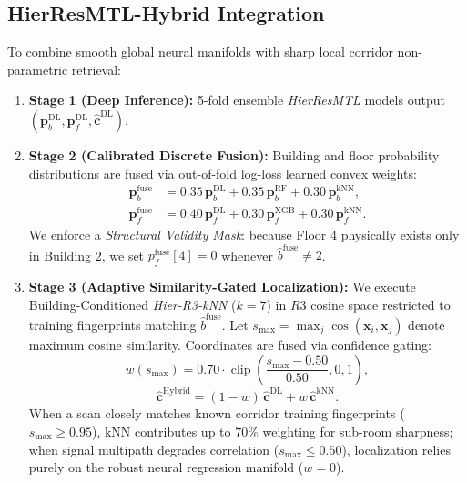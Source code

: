 \documentclass[conference]{IEEEtran}
\begin{document}
\subsection{HierResMTL-Hybrid Integration}
To combine smooth global neural manifolds with sharp local corridor non-parametric retrieval:
\begin{enumerate}
    \item \textbf{Stage 1 (Deep Inference):} 5-fold ensemble \textit{HierResMTL} models output $(\mathbf{p}_b^{\text{DL}}, \mathbf{p}_f^{\text{DL}}, \hat{\mathbf{c}}^{\text{DL}})$.
    \item \textbf{Stage 2 (Calibrated Discrete Fusion):} Building and floor probability distributions are fused via out-of-fold log-loss learned convex weights:
    \begin{align}
    \mathbf{p}_b^{\text{fuse}} &= 0.35\,\mathbf{p}_b^{\text{DL}} + 0.35\,\mathbf{p}_b^{\text{RF}} + 0.30\,\mathbf{p}_b^{\text{kNN}}, \\
    \mathbf{p}_f^{\text{fuse}} &= 0.40\,\mathbf{p}_f^{\text{DL}} + 0.30\,\mathbf{p}_f^{\text{XGB}} + 0.30\,\mathbf{p}_f^{\text{kNN}}.
    \end{align}
    We enforce a \textit{Structural Validity Mask}: because Floor 4 physically exists only in Building 2, we set $p_f^{\text{fuse}}[4] = 0$ whenever $\hat{b}^{\text{fuse}} \neq 2$.
    \item \textbf{Stage 3 (Adaptive Similarity-Gated Localization):} We execute Building-Conditioned \textit{Hier-R3-kNN} ($k=7$) in $R3$ cosine space restricted to training fingerprints matching $\hat{b}^{\text{fuse}}$. Let $s_{\max} = \max_j \cos(\mathbf{x}_i, \mathbf{x}_j)$ denote maximum cosine similarity. Coordinates are fused via confidence gating:
    \begin{equation}
    w(s_{\max}) = 0.70 \cdot \operatorname{clip}\left(\frac{s_{\max} - 0.50}{0.50}, 0, 1\right),
    \end{equation}
    \begin{equation}
    \hat{\mathbf{c}}^{\text{Hybrid}} = (1 - w)\,\hat{\mathbf{c}}^{\text{DL}} + w\,\hat{\mathbf{c}}^{\text{kNN}}.
    \end{equation}
    When a scan closely matches known corridor training fingerprints ($s_{\max} \ge 0.95$), kNN contributes up to 70\% weighting for sub-room sharpness; when signal multipath degrades correlation ($s_{\max} \le 0.50$), localization relies purely on the robust neural regression manifold ($w=0$).
\end{enumerate}
\end{document}
